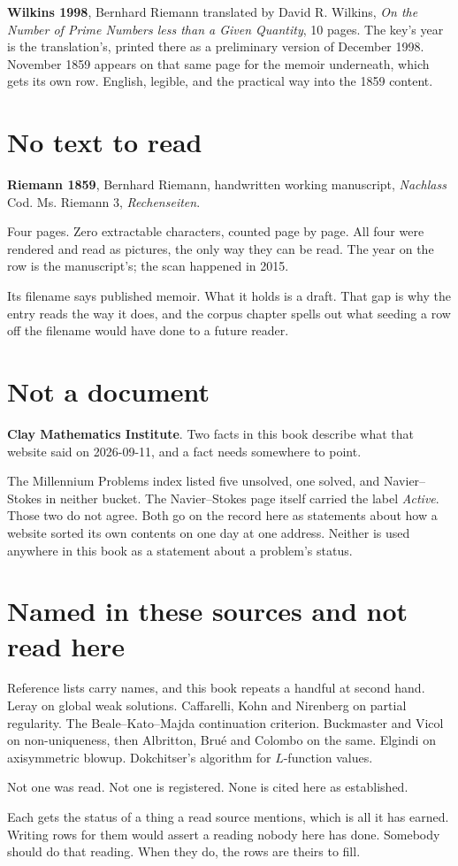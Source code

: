 \textbf{Wilkins 1998}, Bernhard Riemann translated by David R. Wilkins, \emph{On the Number of
Prime Numbers less than a Given Quantity}, 10 pages. The key's year is the translation's, printed
there as a preliminary version of December 1998. November 1859 appears on that same page for the
memoir underneath, which gets its own row. English, legible, and the practical way into the 1859
content.

\section{No text to read}

\textbf{Riemann 1859}, Bernhard Riemann, handwritten working manuscript, \emph{Nachlass} Cod. Ms.
Riemann 3, \emph{Rechenseiten}.

Four pages. Zero extractable characters, counted page by page. All four were rendered and read as
pictures, the only way they can be read. The year on the row is the manuscript's; the scan happened
in 2015.

Its filename says published memoir. What it holds is a draft. That gap is why the entry reads the
way it does, and the corpus chapter spells out what seeding a row off the filename would have done
to a future reader.

\section{Not a document}

\textbf{Clay Mathematics Institute}. Two facts in this book describe what that website said on
2026-09-11, and a fact needs somewhere to point.

The Millennium Problems index listed five unsolved, one solved, and Navier--Stokes in neither
bucket. The Navier--Stokes page itself carried the label \emph{Active}. Those two do not agree.
Both go on the record here as statements about how a website sorted its own contents on one day at
one address. Neither is used anywhere in this book as a statement about a problem's status.

\section{Named in these sources and not read here}

Reference lists carry names, and this book repeats a handful at second hand. Leray on global weak
solutions. Caffarelli, Kohn and Nirenberg on partial regularity. The Beale--Kato--Majda continuation
criterion. Buckmaster and Vicol on non-uniqueness, then Albritton, Bru\'e and Colombo on the same.
Elgindi on axisymmetric blowup. Dokchitser's algorithm for $L$-function values.

Not one was read. Not one is registered. None is cited here as established.

Each gets the status of a thing a read source mentions, which is all it has earned. Writing rows for
them would assert a reading nobody here has done. Somebody should do that reading. When they do, the
rows are theirs to fill.
